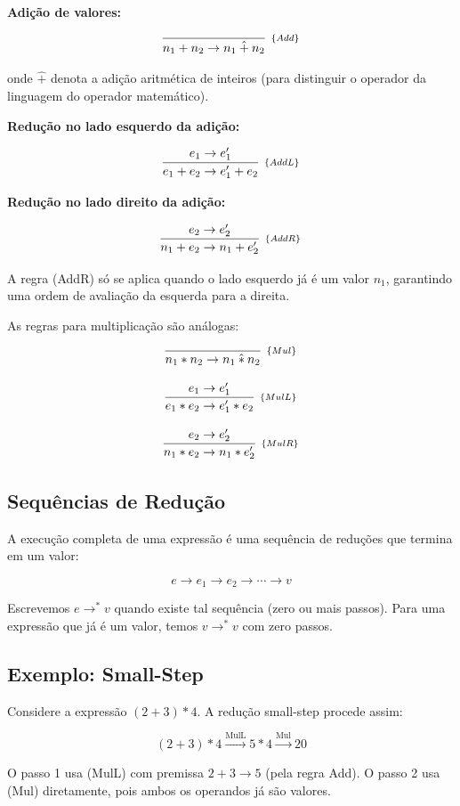 \textbf{Adição de valores:}

\[
  \infer[_{\{Add\}}]{n_1 + n_2 \to n_1 \mathbin{\hat{+}} n_2}{}
\]

onde \(\mathbin{\hat{+}}\) denota a adição aritmética de inteiros
(para distinguir o operador da linguagem do operador matemático).

\textbf{Redução no lado esquerdo da adição:}

\[
  \infer[_{\{AddL\}}]{e_1 + e_2 \to e_1' + e_2}{e_1 \to e_1'}
\]

\textbf{Redução no lado direito da adição:}

\[
  \infer[_{\{AddR\}}]{n_1 + e_2 \to n_1 + e_2'}{e_2 \to e_2'}
\]

A regra (AddR) só se aplica quando o lado esquerdo já é um valor
\(n_1\), garantindo uma ordem de avaliação da esquerda para a direita.

As regras para multiplicação são análogas:

\[
  \infer[_{\{Mul\}}]{n_1 * n_2 \to n_1 \mathbin{\hat{*}} n_2}{}
\]

\[
  \infer[_{\{MulL\}}]{e_1 * e_2 \to e_1' * e_2}{e_1 \to e_1'}
\]

\[
  \infer[_{\{MulR\}}]{n_1 * e_2 \to n_1 * e_2'}{e_2 \to e_2'}
\]

\subsection{Sequências de Redução}

A execução completa de uma expressão é uma sequência de reduções que
termina em um valor:

\[
  e \to e_1 \to e_2 \to \cdots \to v
\]

Escrevemos \(e \to^* v\) quando existe tal sequência (zero ou mais
passos). Para uma expressão que já é um valor, temos \(v \to^* v\)
com zero passos.

\subsection{Exemplo: Small-Step}

Considere a expressão \((2 + 3) * 4\). A redução small-step procede assim:

\[
  (2 + 3) * 4 \xrightarrow{\text{MulL}} 5 * 4 \xrightarrow{\text{Mul}} 20
\]

O passo 1 usa (MulL) com premissa \(2 + 3 \to 5\) (pela regra Add). O
passo 2 usa (Mul) diretamente, pois ambos os operandos já são valores.

